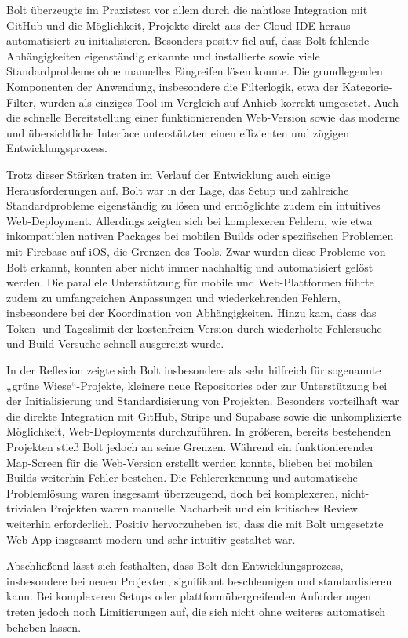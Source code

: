 Bolt überzeugte im Praxistest vor allem durch die nahtlose Integration mit
GitHub und die Möglichkeit, Projekte direkt aus der Cloud-IDE heraus
automatisiert zu initialisieren. Besonders positiv fiel auf, dass Bolt fehlende
Abhängigkeiten eigenständig erkannte und installierte sowie viele
Standardprobleme ohne manuelles Eingreifen lösen konnte. Die grundlegenden
Komponenten der Anwendung, insbesondere die Filterlogik, etwa der
Kategorie-Filter, wurden als einziges Tool im Vergleich auf Anhieb korrekt
umgesetzt. Auch die schnelle Bereitstellung einer funktionierenden Web-Version
sowie das moderne und übersichtliche Interface unterstützten einen effizienten
und zügigen Entwicklungsprozess.

Trotz dieser Stärken traten im Verlauf der Entwicklung auch einige
Herausforderungen auf. Bolt war in der Lage, das Setup und zahlreiche
Standardprobleme eigenständig zu lösen und ermöglichte zudem ein intuitives
Web-Deployment. Allerdings zeigten sich bei komplexeren Fehlern, wie etwa
inkompatiblen nativen Packages bei mobilen Builds oder spezifischen Problemen
mit Firebase auf iOS, die Grenzen des Tools. Zwar wurden diese Probleme von
Bolt erkannt, konnten aber nicht immer nachhaltig und automatisiert gelöst
werden. Die parallele Unterstützung für mobile und Web-Plattformen führte zudem
zu umfangreichen Anpassungen und wiederkehrenden Fehlern, insbesondere bei der
Koordination von Abhängigkeiten. Hinzu kam, dass das Token- und Tageslimit der
kostenfreien Version durch wiederholte Fehlersuche und Build-Versuche schnell
ausgereizt wurde.

In der Reflexion zeigte sich Bolt insbesondere als sehr hilfreich für
sogenannte „grüne Wiese“-Projekte, kleinere neue Repositories oder zur
Unterstützung bei der Initialisierung und Standardisierung von Projekten.
Besonders vorteilhaft war die direkte Integration mit GitHub, Stripe und
Supabase sowie die unkomplizierte Möglichkeit, Web-Deployments durchzuführen.
In größeren, bereits bestehenden Projekten stieß Bolt jedoch an seine Grenzen.
Während ein funktionierender Map-Screen für die Web-Version erstellt werden
konnte, blieben bei mobilen Builds weiterhin Fehler bestehen. Die
Fehlererkennung und automatische Problemlösung waren insgesamt überzeugend,
doch bei komplexeren, nicht-trivialen Projekten waren manuelle Nacharbeit und
ein kritisches Review weiterhin erforderlich. Positiv hervorzuheben ist, dass
die mit Bolt umgesetzte Web-App insgesamt modern und sehr intuitiv gestaltet
war.

Abschließend lässt sich festhalten, dass Bolt den Entwicklungsprozess,
insbesondere bei neuen Projekten, signifikant beschleunigen und standardisieren
kann. Bei komplexeren Setups oder plattformübergreifenden Anforderungen treten
jedoch noch Limitierungen auf, die sich nicht ohne weiteres automatisch beheben
lassen.

